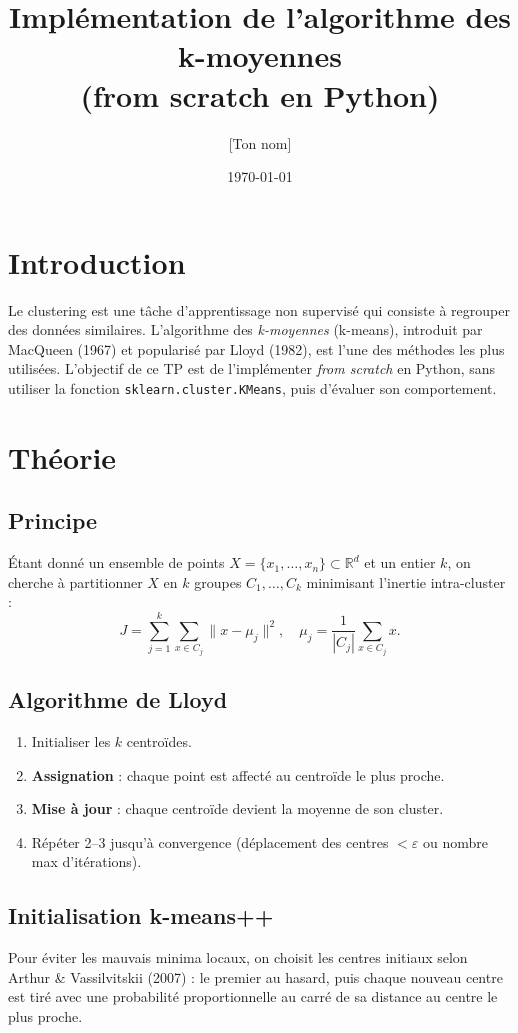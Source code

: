 \documentclass[11pt,a4paper]{article}
\title{Implémentation de l'algorithme des k-moyennes \\ \large (from scratch en Python)}
\author{[Ton nom]}
\date{\today}
\begin{document}
\maketitle

\section{Introduction}
Le clustering est une tâche d'apprentissage non supervisé qui consiste à regrouper des données similaires. L'algorithme des \emph{k-moyennes} (k-means), introduit par MacQueen (1967) et popularisé par Lloyd (1982), est l'une des méthodes les plus utilisées. L'objectif de ce TP est de l'implémenter \emph{from scratch} en Python, sans utiliser la fonction \texttt{sklearn.cluster.KMeans}, puis d'évaluer son comportement.

\section{Théorie}
\subsection{Principe}
Étant donné un ensemble de points $X = \{x_1, \dots, x_n\} \subset \mathbb{R}^d$ et un entier $k$, on cherche à partitionner $X$ en $k$ groupes $C_1, \dots, C_k$ minimisant l'inertie intra-cluster :
\[
J = \sum_{j=1}^{k} \sum_{x \in C_j} \| x - \mu_j \|^2,
\quad \mu_j = \frac{1}{|C_j|} \sum_{x \in C_j} x.
\]

\subsection{Algorithme de Lloyd}
\begin{enumerate}
  \item Initialiser les $k$ centroïdes.
  \item \textbf{Assignation} : chaque point est affecté au centroïde le plus proche.
  \item \textbf{Mise à jour} : chaque centroïde devient la moyenne de son cluster.
  \item Répéter 2--3 jusqu'à convergence (déplacement des centres $< \varepsilon$ ou nombre max d'itérations).
\end{enumerate}

\subsection{Initialisation k-means++}
Pour éviter les mauvais minima locaux, on choisit les centres initiaux selon Arthur \& Vassilvitskii (2007) : le premier au hasard, puis chaque nouveau centre est tiré avec une probabilité proportionnelle au carré de sa distance au centre le plus proche.
\end{document}
